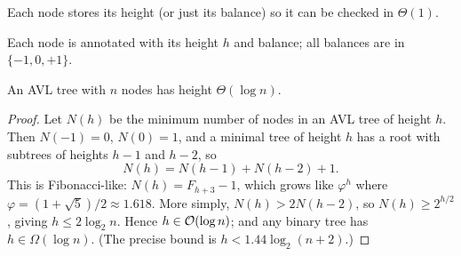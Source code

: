 Each node stores its height (or just its balance) so it can be checked in
$\Theta(1)$.

\begin{center}
\end{center}
Each node is annotated with its height $h$ and balance; all balances are in
$\{-1, 0, +1\}$.

\begin{theorem}
An AVL tree with $n$ nodes has height $\Theta(\log n)$.
\end{theorem}
\begin{proof}
Let $N(h)$ be the minimum number of nodes in an AVL tree of height $h$. Then
$N(-1) = 0$, $N(0) = 1$, and a minimal tree of height $h$ has a root with
subtrees of heights $h-1$ and $h-2$, so
\[
N(h) = N(h-1) + N(h-2) + 1.
\]
This is Fibonacci-like: $N(h) = F_{h+3} - 1$, which grows like $\varphi^h$ where
$\varphi = (1 + \sqrt 5)/2 \approx 1.618$. More simply,
$N(h) > 2N(h-2)$, so $N(h) \ge 2^{h/2}$, giving $h \le 2\log_2 n$. Hence
$h \in \mathcal{O}(\log n)$; and any binary tree has $h \in \Omega(\log n)$.
(The precise bound is $h < 1.44 \log_2(n+2)$.)
\end{proof}

